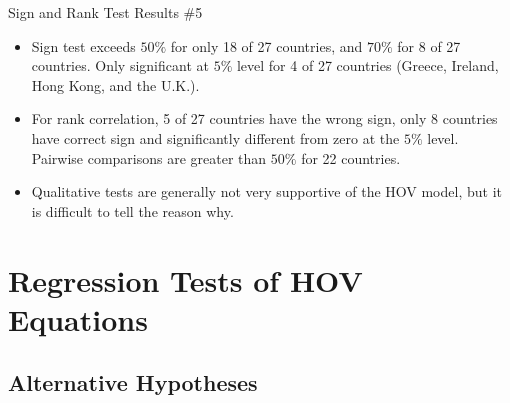 \documentclass[aspectratio=169]{beamer}
\begin{document}

\begin{frame}{Sign and Rank Test Results \#5}

\begin{itemize}
    \item<1-> Sign test exceeds $ 50\% $ for only 18 of 27 countries, and $ 70\% $ for 8 of 27 countries.  Only significant at $ 5\% $ level for 4 of 27 countries (Greece, Ireland, Hong Kong, and the U.K.).
    \item<2-> For rank correlation, 5 of 27 countries have the wrong sign, only 8 countries have correct sign and significantly different from zero at the $ 5\% $ level.  Pairwise comparisons are greater than $ 50\% $ for 22 countries.
    \item<3-> Qualitative tests are generally not very supportive of the HOV model, but it is difficult to tell the reason why.
\end{itemize}
    
\end{frame}


\section{Regression Tests of HOV Equations}

\subsection{Alternative Hypotheses}

\end{document}
